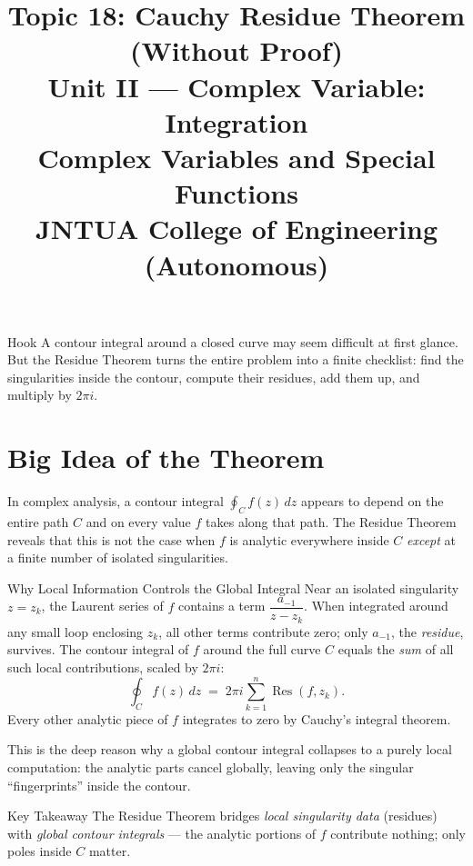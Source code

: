 \documentclass[12pt,a4paper]{article}
\title{\textbf{Topic 18: Cauchy Residue Theorem (Without Proof)}\\[6pt]
\large Unit II --- Complex Variable: Integration\\
\normalsize Complex Variables and Special Functions\\
JNTUA College of Engineering (Autonomous)}
\author{}
\date{}
\begin{document}
\maketitle
\tableofcontents
\newpage

\begin{curiositybox}{Hook}
A contour integral around a closed curve may seem difficult at first glance.
But the Residue Theorem turns the entire problem into a finite checklist:
find the singularities inside the contour, compute their residues, add them up,
and multiply by $2\pi i$.
\end{curiositybox}

\section{Big Idea of the Theorem}

In complex analysis, a contour integral $\oint_{C} f(z)\,dz$ appears to depend
on the entire path $C$ and on every value $f$ takes along that path.
The Residue Theorem reveals that this is not the case when $f$ is analytic
everywhere inside $C$ \emph{except} at a finite number of isolated singularities.

\begin{infobox}{Why Local Information Controls the Global Integral}
Near an isolated singularity $z = z_k$, the Laurent series of $f$ contains
a term $\dfrac{a_{-1}}{z - z_k}$. When integrated around any small loop
enclosing $z_k$, all other terms contribute zero; only $a_{-1}$, the
\emph{residue}, survives. The contour integral of $f$ around the full curve
$C$ equals the \emph{sum} of all such local contributions, scaled by $2\pi i$:
\[
  \oint_{C} f(z)\,dz \;=\; 2\pi i \sum_{k=1}^{n} \operatorname{Res}(f,z_k).
\]
Every other analytic piece of $f$ integrates to zero by Cauchy's integral theorem.
\end{infobox}

This is the deep reason why a global contour integral collapses to a purely local
computation: the analytic parts cancel globally, leaving only the singular
``fingerprints'' inside the contour.

\begin{learnbox}{Key Takeaway}
The Residue Theorem bridges \emph{local singularity data} (residues) with
\emph{global contour integrals} --- the analytic portions of $f$ contribute
nothing; only poles inside $C$ matter.
\end{learnbox}
\end{document}
